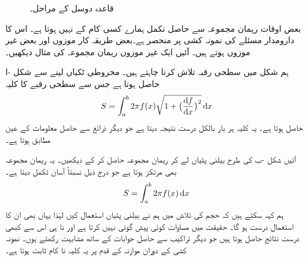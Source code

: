 \begin{figure}
\begin{subfigure}{0.3\textwidth}
\caption{}
\end{subfigure}\hfill
\begin{subfigure}{0.3\textwidth}
\centering
{}
\caption{}
\end{subfigure}
\caption{قاعدہ دوسل کے مراحل۔}
\label{شکل_تکمل_استعمال_مسئلہ_دوسل}
\end{figure}

بعض اوقات ریمان مجموعہ سے حاصل تکمل ہمارے کسی کام کے نہیں ہوتا ہے۔ اس کا دارومدار مسئلے کی نمونہ کشی پر منحصر ہے۔بعض طریقہ کار موزوں اور بعض غیر موزوں ہوتے ہیں۔ آئیں ایک غیر موزوں ریمان مجموعہ کی مثال دیکھیں۔

ہم شکل  میں سطحی رقبہ تلاش کرنا چاہتے ہیں۔ مخروطی ٹکیاں لینے سے شکل -ا حاصل ہوتا ہے جس سے  سطحی رقبے کا کلیہ
\begin{align}
S=\int_a^b 2\pi f(x)\sqrt{1+\big(\frac{\dif f}{\dif x}\big)^2}\dif x
\end{align} 
حاصل ہوتا ہے۔ یہ کلیہ  ہر بار بالکل درست نتیجہ دیتا ہے جو دیگر ذرائع سے حاصل معلومات کے عین مطابق ہوتا ہے۔

آئیں شکل -ب کی طرح بیلنی پٹیاں لے کر ریمان مجموعہ حاصل کر کے دیکھیں۔ یہ ریمان مجموعہ بھی مرتکز ہوتا ہے جو درج ذیل نسبتاً آسان تکمل دیتا ہے۔
\begin{align}\label{مساوات_تکمل_استعمال_غلط_کلیہ}
S=\int_a^b 2\pi f(x)\dif x
\end{align}
ہم کہہ سکتے ہیں کہ حجم کی تلاش میں ہم نے بیلنی پٹیاں استعمال کیں لہٰذا یہاں بھی ان کا استعمال درست ہو گا۔ حقیقت میں  مساوات  کوئی پیش گوئی نہیں کرتا ہے اور نا ہی اس سے کبھی درست نتائج حاصل ہوتا ہیں جو دیگر تراکیب سے حاصل جوابات کے ساتھ مشابہت رکھتے ہوں۔ نمونہ کشی کے دوران موازنہ کے قدم پر یہ کلیہ نا کام ثابت ہوتا ہے۔

